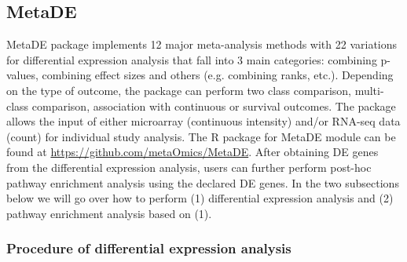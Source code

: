 \subsection{MetaDE}

MetaDE package implements 12 major meta-analysis methods with 22 variations for differential expression analysis that fall into 3 main categories: combining p-values, combining effect sizes and others (e.g. combining ranks, etc.). Depending on the type of outcome, the package can perform two class comparison, multi-class comparison, association with continuous or survival outcomes. The package allows the input of either microarray (continuous intensity) and/or RNA-seq data (count) for individual study analysis. 
The R package for MetaDE module can be found at \url{https://github.com/metaOmics/MetaDE}.
After obtaining DE genes from the differential expression analysis, 
users can further perform post-hoc pathway enrichment analysis using the declared DE genes.
In the two subsections below we will go over how to perform (1) differential expression analysis and (2) pathway enrichment analysis based on (1).

\subsubsection{Procedure of differential expression analysis}

